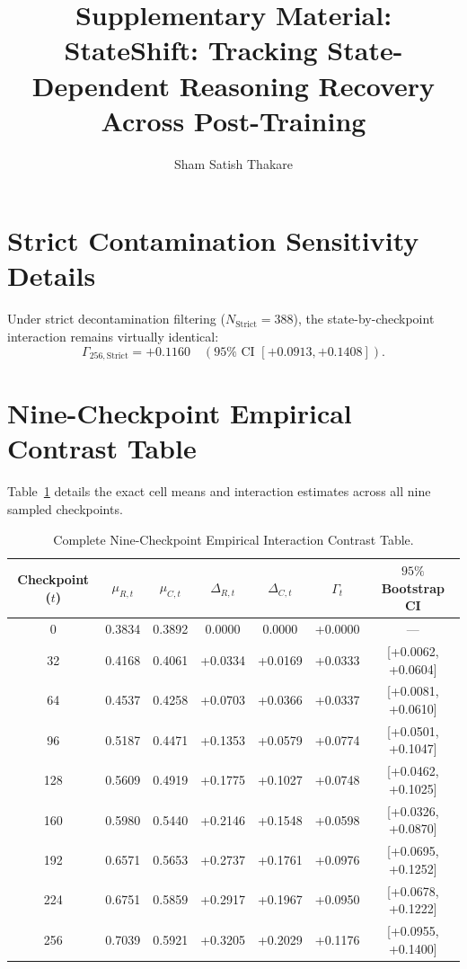 \documentclass[11pt,3p,review]{elsarticle}
\begin{document}
\begin{frontmatter}
\title{Supplementary Material: StateShift: Tracking State-Dependent Reasoning Recovery Across Post-Training}
\author{Sham Satish Thakare}
\address{Independent Researcher, Pune, Maharashtra, India}
\end{frontmatter}

\section{Strict Contamination Sensitivity Details}
Under strict decontamination filtering ($N_{\text{Strict}} = 388$), the state-by-checkpoint interaction remains virtually identical:
\begin{equation}
\Gamma_{256,\text{Strict}} = +0.1160 \quad (95\% \text{ CI } [+0.0913, +0.1408]).
\end{equation}

\section{Nine-Checkpoint Empirical Contrast Table}
Table~\ref{tab:supp_trajectory} details the exact cell means and interaction estimates across all nine sampled checkpoints.

\begin{table}[h]
\centering
\caption{Complete Nine-Checkpoint Empirical Interaction Contrast Table.}
\label{tab:supp_trajectory}
\begin{tabular}{ccccccc}
\toprule
Checkpoint ($t$) & $\mu_{R,t}$ & $\mu_{C,t}$ & $\Delta_{R,t}$ & $\Delta_{C,t}$ & $\Gamma_t$ & $95\%$ Bootstrap CI \\
\midrule
0   & 0.3834 & 0.3892 & 0.0000 & 0.0000 & +0.0000 & --- \\
32  & 0.4168 & 0.4061 & +0.0334 & +0.0169 & +0.0333 & [+0.0062, +0.0604] \\
64  & 0.4537 & 0.4258 & +0.0703 & +0.0366 & +0.0337 & [+0.0081, +0.0610] \\
96  & 0.5187 & 0.4471 & +0.1353 & +0.0579 & +0.0774 & [+0.0501, +0.1047] \\
128 & 0.5609 & 0.4919 & +0.1775 & +0.1027 & +0.0748 & [+0.0462, +0.1025] \\
160 & 0.5980 & 0.5440 & +0.2146 & +0.1548 & +0.0598 & [+0.0326, +0.0870] \\
192 & 0.6571 & 0.5653 & +0.2737 & +0.1761 & +0.0976 & [+0.0695, +0.1252] \\
224 & 0.6751 & 0.5859 & +0.2917 & +0.1967 & +0.0950 & [+0.0678, +0.1222] \\
256 & 0.7039 & 0.5921 & +0.3205 & +0.2029 & +0.1176 & [+0.0955, +0.1400] \\
\bottomrule
\end{tabular}
\end{table}
\end{document}
